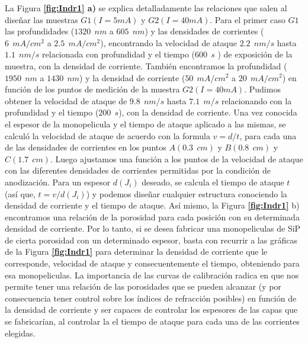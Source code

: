 \documentclass[a4paper,11pt,]{book}
\begin{document}
La Figura\textbf{ \ref{fig:Indr1} a)} se explica detalladamente las relaciones que salen al diseñar las muestras $G1 (I=5 mA)$ y $G2 (I=40 mA)$. Para el primer caso $G1$  las profundidades ($1320 \ \ nm$ a $605\ \ nm$) y las densidades de corrientes ($6 \ \ mA/cm^2$ a $2.5 \ \ mA/cm^2$), encontrando la velocidad de ataque $2.2 \ \ nm/s$ hasta $1.1 \ \ nm/s$ relacionada con profundidad y el tiempo ($600 \ \ s$ ) de exposición de la muestra, con la densidad de corriente. También  encontramos la profundidad  ($1950 \ \ nm$ a $1430 \ \ nm$) y la densidad   de corriente ($50 \ \ mA/cm^2$ a $20 \ \ mA/cm^2$) en función de los puntos de medición de la muestra  $G2 (I=40 mA)$. Pudimos obtener  la velocidad de ataque de $9.8\ \ nm/s$ hasta $7.1 \ \ m/s$ relacionando con la profundidad  y el tiempo ($200 \ \ s$), con la densidad de corriente. Una vez conocida el espesor de la monopelicula y el tiempo de ataque aplicado a las mismas, se calculó la velocidad de ataque  de acuerdo con la formula $v=d/t$, para cada una de las   densidades de corrientes en los puntos  $A(0.3\ \ cm)$ y $ B(0.8 \ \  cm)$ y $ C(1.7 \ \  cm)$. Luego ajustamos una función a los puntos de la velocidad de ataque con las diferentes densidades de corrientes permitidas por la condición de anodización.  Para un espesor $d(J_i)$ deseado, se calcula el tiempo de ataque $t$ (así que, $t=v/d(J_i)$) y podemos diseñar cualquier estructura conociendo la densidad de corriente y el tiempo de ataque.
Así mismo, la Figura \textbf{\ref{fig:Indr1}} b) encontramos una relación de la porosidad para cada posición con su determinada densidad de corriente. Por lo tanto, si se desea fabricar una monopeliculas de SiP de cierta porosidad con un determinado espesor, basta con recurrir a las gráficas de la Figura \textbf{\ref{fig:Indr1}}  para determinar la densidad de corriente que le corresponde, velocidad de ataque y consecuentemente el tiempo, obteniendo para esa monopeliculas. La importancia de las curvas de calibración radica en que nos permite tener una relación de las porosidades que se pueden alcanzar (y por consecuencia tener control sobre los índices de refracción posibles) en función de la densidad de corriente y ser capaces de controlar los espesores de las capas que se fabricarían, al controlar la el tiempo de ataque para cada una de las corrientes elegidas.
\end{document}

